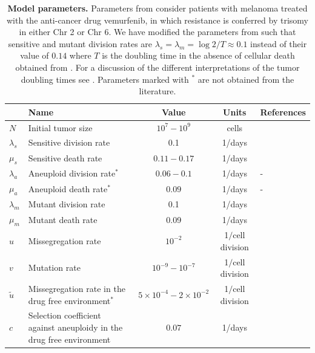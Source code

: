 \documentclass[12pt]{extarticle}
\begin{document}
\newpage
\begin{table}
\begin{center}
  \begin{tabular}{| l |p{5cm}| c | c | p{3cm} |}
    \hline
     & Name & Value & Units & References \\ \hline
    $N$ & Initial tumor size & $10^7-10^9$ & cells  & \citet{del2009does} \\ \hline
    $\lambda_s$ & Sensitive division rate& 0.1 & 1/days  & \citet{bozic2013evolutionary,rew2000cell} \\ \hline
    $\mu_s$ & Sensitive death rate& $0.11-0.17$ & 1/days  & \citet{bozic2013evolutionary} \\ \hline
    $\lambda_a$  & Aneuploid division rate$^\ast$ & $0.06-0.1$ & 1/days  & - \\ \hline
    $\mu_a$ & Aneuploid death rate$^\ast$ & $0.09$ & 1/days  & - \\ \hline
    $\lambda_m$ & Mutant division rate& 0.1 & 1/days  & \citet{bozic2013evolutionary,rew2000cell} \\ \hline
    $\mu_m$ & Mutant death rate& 0.09 & 1/days  & \citet{bozic2013evolutionary,carlson2003tumor} \\ \hline
    $u$ & Missegregation rate& $10^{-2}$ & 1$\slash$cell division  & \citet{lee2016effects} \\ \hline
    $v$ & Mutation rate& $10^{-9}-10^{-7}$ &  1$\slash$cell division  & \citet{bozic2013evolutionary,loeb2001mutator} \\  \hline
    $\tilde{u}$ & Missegregation rate in the drug free environment$^\ast$& $5\times10^{-4}-2\times10^{-2}$ & 1$\slash$cell division  & \citet{shi2005chromosome,thompson2008examining} \\ \hline
    $c$ & Selection coefficient against aneuploidy in the drug free environment& $0.07$ &  1/days   & \citet{lukow2021chromosomal} \\  
    \hline
  \end{tabular}
\caption{\textbf{Model parameters.} 
Parameters from \citet{bozic2013evolutionary} consider patients with melanoma treated with the anti-cancer drug vemurfenib, in which resistance is conferred by trisomy in either Chr 2 or Chr 6.
We have modified the parameters from \citet{bozic2013evolutionary} such that sensitive and mutant division rates are $\lambda_{s} = \lambda_{m} = \log2/T\approx0.1$ instead of their value of $0.14$ where $T$ is the doubling time in the absence of cellular death obtained from \citet{rew2000cell}. For a discussion of the different interpretations of the tumor doubling times see \citet{avanzini2019cancer}. Parameters marked with $^\ast$ are not obtained from the literature.} %
  \label{table1}
\end{center}
\end{table}
\end{document}
